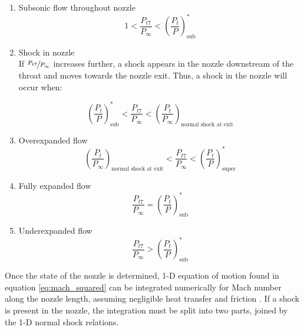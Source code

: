 \documentclass{article}
\begin{document}
\begin{enumerate}
\item Subsonic flow throughout nozzle \\ 

\begin{equation*}
1 <\frac{P_{t7}}{P_{\infty}} < \left( \frac{P_t}{P} \right)_{\textrm{sub}}^*
\end{equation*}

\item Shock in nozzle \\ 

If $\sfrac{P_{t7}}{P_{\infty}}$ increases further, a shock appears in the nozzle downstream of the throat and moves towards the nozzle exit. Thus, a shock in the nozzle will occur when:

\begin{equation*}
\left( \frac{P_t}{P} \right)_{\textrm{sub}}^* < \frac{P_{t7}}{P_{\infty}} < \left( \frac{P_t}{P_{\infty}} \right)_{\textrm{normal shock at exit}}
\end{equation*}

\item Overexpanded flow \\

\begin{equation*}
\left( \frac{P_t}{P_{\infty}} \right)_{\textrm{normal shock at exit}} < \frac{P_{t7}}{P_{\infty}} < \left( \frac{P_t}{P} \right)_{\textrm{super}}^*
\end{equation*}

\item Fully expanded flow \\

\begin{equation*}
\frac{P_{t7}}{P_{\infty}} = \left( \frac{P_t}{P} \right)_{\textrm{sub}}^*
\end{equation*}

\item Underexpanded flow \\

\begin{equation*}
\frac{P_{t7}}{P_{\infty}} > \left( \frac{P_t}{P} \right)_{\textrm{sub}}^*
\end{equation*}

\end{enumerate}

Once the state of the nozzle is determined, 1-D equation of motion found in equation \ref{eq:mach_squared} can be integrated numerically for Mach number along the nozzle length, assuming negligible heat transfer and friction \cite{cantwell210}. If a shock is present in the nozzle, the integration must be split into two parts, joined by the 1-D normal shock relations.
\end{document}
